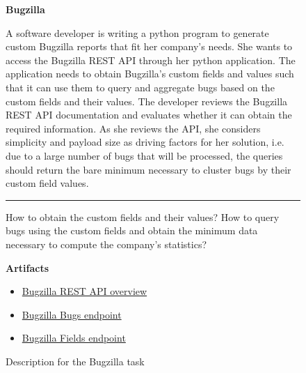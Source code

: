 \begin{figure}
\begin{mdframed}[backgroundcolor=gray!05] 
\begin{scriptsize}

{\large \textbf{Bugzilla}} \bigskip


A software developer is writing a python program to generate custom Bugzilla reports that fit her company's needs. She wants to access the Bugzilla REST API through her python application.
The application needs to obtain Bugzilla's custom fields and values such that it can use them to query and aggregate bugs based on the custom fields and their values. The developer reviews the Bugzilla REST API documentation and evaluates whether it can obtain the required information. As she reviews the API, she considers simplicity and payload size as driving factors for her solution, i.e. due to a large number of bugs that will be processed, the queries should return the bare minimum necessary to cluster bugs by their custom field values.


\begin{center}
\rule{10cm}{0.4pt}
\end{center}

How to obtain the custom fields and their values? How to query bugs using the custom
fields and obtain the minimum data necessary to compute the company's statistics?

\medskip

\textbf{Artifacts}

\begin{itemize}
    \item \href{https://bugzilla.readthedocs.io/en/latest/api/core/v1/general.html}{Bugzilla REST API overview}
    \item \href{https://bugzilla.readthedocs.io/en/latest/api/core/v1/bug.html}{Bugzilla Bugs endpoint}
    \item \href{https://bugzilla.readthedocs.io/en/latest/api/core/v1/field.html}{Bugzilla Fields endpoint}
\end{itemize}

\end{scriptsize}
\end{mdframed}
\caption{Description for the Bugzilla task}
\end{figure}

    
